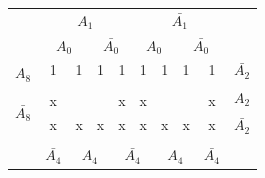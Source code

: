 \documentclass[a4paper,14pt]{article}
\begin{document}
\begin{table}[!htb]
\begin{minipage}{.5\linewidth}
		\begin{tabular}{cccccccccc}
			& \multicolumn{4}{c}{$A_1$}                                                                         & \multicolumn{4}{c}{$\bar{A_1}$}                                                                   &                        \\
			& \multicolumn{2}{c}{$A_0$}                       & \multicolumn{2}{c}{$\bar{A_0}$}                 & \multicolumn{2}{c}{$A_0$}                       & \multicolumn{2}{c}{$\bar{A_0}$}                 &                        \\ \cline{2-9}
			\multicolumn{1}{c|}{\multirow{2}{*}{$A_8$}}       & \multicolumn{1}{c|}{1} & \multicolumn{1}{c|}{1} & \multicolumn{1}{c|}{1} & \multicolumn{1}{c|}{1} & \multicolumn{1}{c|}{1} & \multicolumn{1}{c|}{1} & \multicolumn{1}{c|}{1} & \multicolumn{1}{c|}{1} & $\bar{A_2}$            \\ \cline{2-9}
			\multicolumn{1}{c|}{}                             & \multicolumn{1}{c|}{}  & \multicolumn{1}{c|}{}  & \multicolumn{1}{c|}{}  & \multicolumn{1}{c|}{}  & \multicolumn{1}{c|}{}  & \multicolumn{1}{c|}{}  & \multicolumn{1}{c|}{}  & \multicolumn{1}{c|}{}  & \multirow{2}{*}{$A_2$} \\ \cline{2-9}
			\multicolumn{1}{c|}{\multirow{2}{*}{$\bar{A_8}$}} & \multicolumn{1}{c|}{x} & \multicolumn{1}{c|}{}  & \multicolumn{1}{c|}{}  & \multicolumn{1}{c|}{x} & \multicolumn{1}{c|}{x} & \multicolumn{1}{c|}{}  & \multicolumn{1}{c|}{}  & \multicolumn{1}{c|}{x} &                        \\ \cline{2-9}
			\multicolumn{1}{c|}{}                             & \multicolumn{1}{c|}{x} & \multicolumn{1}{c|}{x} & \multicolumn{1}{c|}{x} & \multicolumn{1}{c|}{x} & \multicolumn{1}{c|}{x} & \multicolumn{1}{c|}{x} & \multicolumn{1}{c|}{x} & \multicolumn{1}{c|}{x} & $\bar{A_2}$            \\ \cline{2-9}
			\\
			& $\bar{A_4}$            & \multicolumn{2}{c}{$A_4$}                       & \multicolumn{2}{c}{$\bar{A_4}$}                 & \multicolumn{2}{c}{$A_4$}                       & $\bar{A_4}$            &                       
		\end{tabular}
	\end{minipage} 
\end{table}
\end{document}
